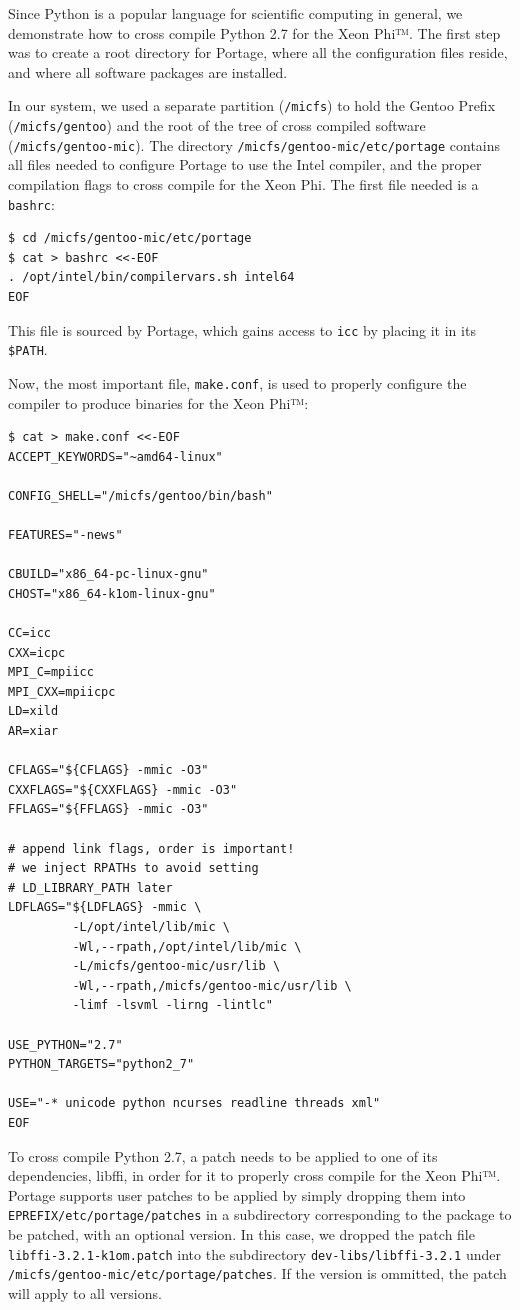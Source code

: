 \documentclass[a4paper,conference]{IEEEtran}
\begin{document}
Since Python is a popular language for scientific computing in general,
we demonstrate how to cross compile Python 2.7 for the Xeon Phi™. The
first step was to create a root directory for Portage, where all the
configuration files reside, and where all software packages are
installed.

In our system, we used a separate partition (\verb|/micfs|) to hold the
Gentoo Prefix (\verb|/micfs/gentoo|) and the root of the tree of cross
compiled software (\verb|/micfs/gentoo-mic|). The directory
\verb|/micfs/gentoo-mic/etc/portage| contains all files needed to
configure Portage to use the Intel compiler, and the proper compilation
flags to cross compile for the Xeon Phi.
The first file needed is a \verb|bashrc|:
\begin{verbatim}
$ cd /micfs/gentoo-mic/etc/portage
$ cat > bashrc <<-EOF
. /opt/intel/bin/compilervars.sh intel64
EOF
\end{verbatim}
This file is sourced by Portage, which gains access to \verb|icc|
by placing it in its \verb|$PATH|.

Now, the most important file, \verb|make.conf|, is used to properly
configure the compiler to produce binaries for the Xeon Phi™:

{\footnotesize
\begin{verbatim}
$ cat > make.conf <<-EOF
ACCEPT_KEYWORDS="~amd64-linux"

CONFIG_SHELL="/micfs/gentoo/bin/bash"

FEATURES="-news"

CBUILD="x86_64-pc-linux-gnu"
CHOST="x86_64-k1om-linux-gnu"

CC=icc
CXX=icpc
MPI_C=mpiicc
MPI_CXX=mpiicpc
LD=xild
AR=xiar

CFLAGS="${CFLAGS} -mmic -O3"
CXXFLAGS="${CXXFLAGS} -mmic -O3"
FFLAGS="${FFLAGS} -mmic -O3"

# append link flags, order is important!
# we inject RPATHs to avoid setting
# LD_LIBRARY_PATH later
LDFLAGS="${LDFLAGS} -mmic \
         -L/opt/intel/lib/mic \
         -Wl,--rpath,/opt/intel/lib/mic \
         -L/micfs/gentoo-mic/usr/lib \
         -Wl,--rpath,/micfs/gentoo-mic/usr/lib \
         -limf -lsvml -lirng -lintlc"

USE_PYTHON="2.7"
PYTHON_TARGETS="python2_7"

USE="-* unicode python ncurses readline threads xml"
EOF
\end{verbatim}
}

To cross compile Python 2.7, a patch \cite{libffi-k1om} needs to be
applied to one of its dependencies, libffi, in order for it to properly
cross compile for the Xeon Phi™. Portage supports user patches to be
applied by simply dropping them into \verb|EPREFIX/etc/portage/patches|
in a subdirectory corresponding to the package to be patched, with an
optional version. In this case, we dropped the patch file
\verb|libffi-3.2.1-k1om.patch| into the subdirectory
\verb|dev-libs/libffi-3.2.1| under
\verb|/micfs/gentoo-mic/etc/portage/patches|.
If the version is ommitted, the patch will apply to all versions.
\end{document}
